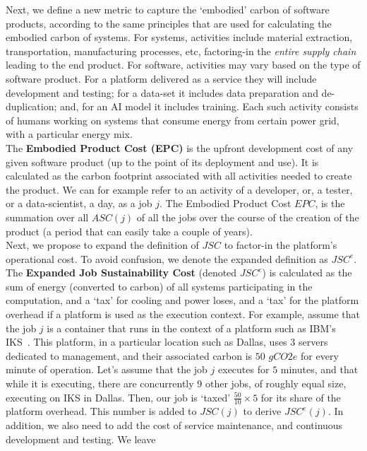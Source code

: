 Next, we define a new metric to capture the `embodied' carbon of software products, according to the same principles that are used for calculating the embodied carbon of systems. For systems, activities include material extraction, transportation, manufacturing processes, etc, factoring-in the {\em entire supply chain} leading to the end product. For software, activities may vary based on the type of software product. For a platform delivered as a service they will include development and testing; for a data-set it includes data preparation and de-duplication; and,
for an AI model it includes training. Each such activity consists of humans working on systems that consume energy from certain power grid, with a particular energy mix. 
\\ The {\bf Embodied Product Cost (EPC)} is the upfront development cost of any given software product (up to the point of its deployment and use). It is calculated as the carbon footprint associated with all activities needed to create the product. We can for example refer to an activity of a developer, or, a tester, or a data-scientist, a day, as a job $j$. The Embodied Product Cost $EPC$, is the summation over all $ASC(j)$ of all the jobs over the course of the creation of the product (a period that can easily take a couple of years).  
\\
Next, we propose to expand the definition of $JSC$ to factor-in the platform's operational cost. 
To avoid confusion, we denote the expanded definition as $JSC^e$. \\
The \textbf{Expanded Job Sustainability Cost} (denoted $JSC^e$) is calculated as the sum of energy (converted to carbon) of all systems participating in the computation, 
and a `tax' for cooling and power loses, and a `tax' for the platform overhead if a platform is used as the execution context. For example, assume that the job $j$ is a container that runs in the context of a platform such as IBM's IKS~\cite{iks}. This platform, in a particular location such as Dallas, uses $3$ servers dedicated to management, and their associated carbon is $50$ $gCO2e$ for every minute
of operation. Let's assume that the job $j$ executes for $5$ minutes, and that while it is executing, there are concurrently $9$ other jobs, of roughly equal size, executing on IKS in Dallas. Then, our job is `taxed' $\frac{50}{10} \times 5$ for its share of the platform overhead. This 
number is added to $JSC(j)$ to derive $JSC^e(j)$. 
In addition, we also need to add the cost of service maintenance, and continuous development and testing. We leave
